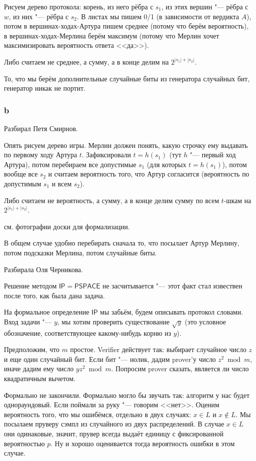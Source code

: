 	Рисуем дерево протокола: корень, из него рёбра с $s_1$, из этих вершин "--- рёбра с $w$,
	из них "--- рёбра с $s_2$.
	В листах мы пишем 0/1 (в зависимости от вердикта $A$), потом в вершинах-ходах-Артура пишем
	среднее (потому что берём вероятность), в вершинах-ходах-Мерлина берём максимум (потому что
	Мерлин хочет максимизировать вероятность ответа <<да>>).

	Либо считаем не среднее, а сумму, а в конце делим на $2^{|s_1|+|s_2|}$.

	\begin{Rem}
		То, что мы берём дополнительные случайные биты из генератора случайных бит, генератор никак не портит.
	\end{Rem}

	\subsubsection{b}
	Разбирал Петя Смирнов.

	Опять рисуем дерево игры.
	Мерлин должен понять, какую строчку ему выдавать по первому ходу Артура $t$.
	Зафиксировали $t=h(s_1)$ (тут $h$ "--- первый ход Артура), потом перебираем
	все допустимые $s_1$ (для которых $t=h(s_1)$), потом вообще все $s_2$ и считаем вероятность того,
	что Артур согласится (вероятность по допустимым $s_1$ и всем $s_2$).

	Либо считаем не вероятность, а сумму, а в конце делим сумму по всем $t$-шкам на $2^{|s_1|+|s_2|}$.

	\TODO см. фотографии доски для формализации.

	\begin{Rem}
		В общем случае удобно перебирать сначала то, что посылает Артур Мерлину, потом
		подсказки Мерлина, потом случайные биты.
	\end{Rem}

	Разбирала Оля Черникова.

	\begin{Rem}
		Решение методом $\mathsf{IP}=\mathsf{PSPACE}$ не засчитывается "--- этот факт стал извествен после того, как была дана задача.
	\end{Rem}

	На формальное определение $\mathsf{IP}$ мы забьём, будем описывать протокол словами.
	Вход задачи "--- $y$, мы хотим проверить существование $\sqrt y$ (это условное обозначение,
	соответствующее какому-нибудь корню из $y$).

	Предположим, что $m$ простое.
	Verifier действует так: выбирает случайное число $z$ и еще один случайный бит.
	Если бит "--- нолик, дадим prover'у число $z^2 \bmod m$, иначе дадим ему число $yz^2 \bmod m$.
	Попросим prover сказать, является ли число квадратичным вычетом.

	Формально не закончили.
	Формально могло бы звучать так: алгоритм у нас будет однораундовый.
	Если поймали за руку "--- говорим <<нет>>.
	Оценим вероятность того, что мы ошибёмся, отдельно в двух случаях: $x \in L$ и $x \notin L$.
	Мы посылаем пруверу сэмпл из случайного из двух распределений.
	В случае $x \in L$ они одинаковые, значит, прувер всегда выдаёт единицу с фиксированной вероятностью $p$.
	Ну и хорошо оценивается тогда вероятность ошибки в этом случае.

